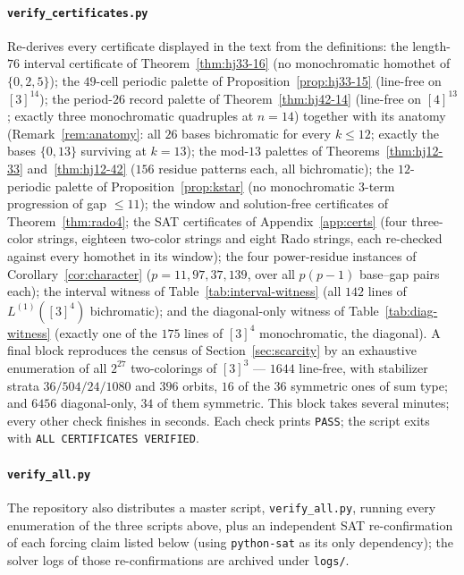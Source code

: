 \documentclass[12pt]{article}
\newcommand{\Ls}{L}
\begin{document}
\paragraph{\texttt{verify\_certificates.py}}
Re-derives every certificate displayed in the text from the
definitions: the length-$76$ interval certificate of
Theorem~\ref{thm:hj33-16} (no monochromatic homothet of $\{0,2,5\}$);
the $49$-cell periodic palette of Proposition~\ref{prop:hj33-15}
(line-free on $[3]^{14}$); the period-$26$ record palette of
Theorem~\ref{thm:hj42-14} (line-free on $[4]^{13}$; exactly three
monochromatic quadruples at $n=14$) together with its anatomy
(Remark~\ref{rem:anatomy}: all $26$ bases bichromatic for every
$k\le 12$; exactly the bases $\{0,13\}$ surviving at $k=13$); the
mod-$13$ palettes of Theorems~\ref{thm:hj12-33} and~\ref{thm:hj12-42}
($156$ residue patterns each, all bichromatic); the $12$-periodic
palette of Proposition~\ref{prop:kstar} (no monochromatic $3$-term
progression of gap $\le 11$); the window and solution-free
certificates of Theorem~\ref{thm:rado4}; the SAT certificates of
Appendix~\ref{app:certs} (four three-color strings, eighteen
two-color strings and eight Rado strings, each re-checked against every
homothet in its window); the four power-residue
instances of Corollary~\ref{cor:character} ($p=11,97,37,139$, over
all $p(p-1)$ base--gap pairs each); the interval witness of
Table~\ref{tab:interval-witness} (all $142$ lines of
$\Ls^{(1)}([3]^{4})$ bichromatic); and the diagonal-only witness of
Table~\ref{tab:diag-witness} (exactly one of the $175$ lines of
$[3]^{4}$ monochromatic, the diagonal). A final block reproduces the
census of Section~\ref{sec:scarcity} by an exhaustive enumeration of
all $2^{27}$ two-colorings of $[3]^{3}$ --- $1644$ line-free, with
stabilizer strata $36/504/24/1080$ and $396$ orbits, $16$ of the $36$
symmetric ones of sum type; and $6456$ diagonal-only, $34$ of them
symmetric. This block takes several minutes; every other check finishes
in seconds. Each check prints \texttt{PASS}; the script exits with
\texttt{ALL CERTIFICATES VERIFIED}.

\paragraph{\texttt{verify\_all.py}}
The repository \cite{hjcerts} also distributes a master script,
\texttt{verify\_all.py}, running every enumeration of the three
scripts above, plus an independent SAT re-confirmation of each
forcing claim listed below (using \texttt{python-sat} as its only
dependency); the solver logs of those re-confirmations are archived
under \texttt{logs/}.
\end{document}
